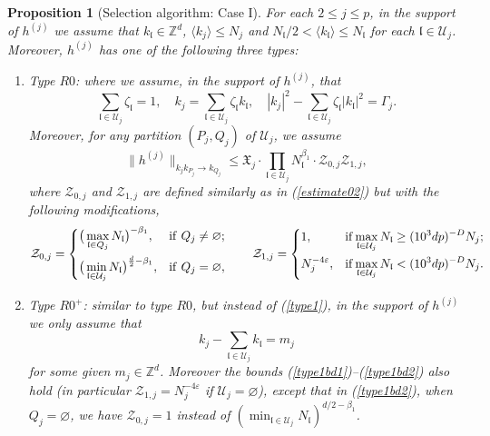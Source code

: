 \documentclass[11 pt,reqno]{amsart}
\newtheorem{prop}[thm]{Proposition}
\theoremstyle{definition}
\theoremstyle{remark}
\numberwithin{equation}{section}
\newcommand{\Uc}{\mathcal{U}}
\newcommand{\Zc}{\mathcal{Z}}
\newcommand{\Zb}{\mathbb{Z}}
\newcommand{\Xf}{\mathfrak{X}}
\newcommand{\lf}{\mathfrak{l}}
\begin{document}
{\begin{prop}[Selection algorithm: Case I]
For each $2\leq j\leq p$, in the support of $h^{(j)}$ we assume that $k_\lf\in\Zb^d$, $\langle k_j\rangle\leq N_j$ and $N_\lf/2<\langle k_\lf\rangle\leq N_\lf$ for each $\lf\in\Uc_j$. Moreover, $h^{(j)}$ has one of the following three types:
\begin{enumerate}
\item Type $R0$: where we assume, in the support of $h^{(j)}$, that
\begin{equation}\label{type1}\sum_{\lf\in \Uc_j}\zeta_\lf=1,\quad k_j=\sum_{\lf\in\Uc_j}\zeta_\lf k_\lf,\quad |k_j|^2-\sum_{\lf\in\Uc_j}\zeta_\lf |k_\lf|^2=\Gamma_j.
\end{equation} Moreover, for any partition $(P_j,Q_j)$ of $\Uc_j$, we assume
\begin{equation}\label{type1bd1}\|h^{(j)}\|_{k_jk_{P_j}\to k_{Q_j}}\leq \Xf_j\cdot \prod_{\lf\in \Uc_j}N_\lf^{\beta_1}\cdot\Zc_{0,j}\Zc_{1,j},
\end{equation}where $\Zc_{0,j}$ and $\Zc_{1,j}$ are defined similarly as in (\ref{estimate02}) but with the following modifications,
 \begin{equation}\label{type1bd2}\Zc_{0,j}=\left\{
  \begin{aligned}&\big(\max_{\lf\in Q_j}N_\lf\big)^{-\beta_1},&&\mathrm{if\ }Q_j\neq\varnothing;\\
    & \big(\min_{\lf\in\Uc_j}N_\lf\big)^{\frac{d}{2}-\beta_1},&&\mathrm{if\ }Q_j=\varnothing,
 \end{aligned}
 \right.\qquad\Zc_{1,j}=\left\{
 \begin{aligned}&1,&{\rm{if }}\max_{\lf\in \Uc_j}N_\lf&\geq (10^3dp)^{-D}N_j;\\
&N_j^{-4\varepsilon},&{\rm{if }}\max_{\lf\in \Uc_j}N_\lf&< (10^3dp)^{-D}N_j.
 \end{aligned}
 \right.
 \end{equation}

 \item Type $R0^+$: similar to type $R0$, but instead of (\ref{type1}), in the support of $h^{(j)}$ we only assume that 
\begin{equation}\label{type1+}
 k_j-\sum_{\lf\in\Uc_j}k_\lf=m_j\end{equation} for some given $m_j\in \Zb^d$. Moreover the bounds (\ref{type1bd1})--(\ref{type1bd2}) also hold (in particular $\Zc_{1,j}=N_j^{-4\varepsilon}$ if $\Uc_j=\varnothing$), except that in (\ref{type1bd2}), when $Q_j=\varnothing$, we have $\Zc_{0,j}=1$ instead of $(\min_{\lf\in\Uc_j}N_\lf)^{d/2-\beta_1}$.


\end{enumerate}
\end{prop}}
\end{document}
